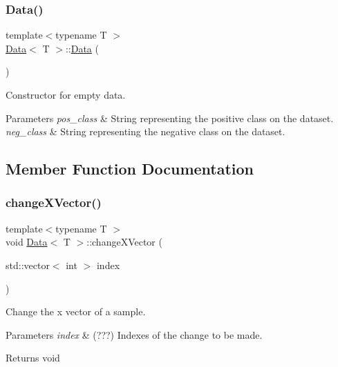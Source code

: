 \subsubsection{\texorpdfstring{Data()}{Data()}\hspace{0.1cm}{\footnotesize\ttfamily [2/2]}}
{\footnotesize\ttfamily template$<$typename T $>$ \\
\hyperlink{class_data}{Data}$<$ T $>$\+::\hyperlink{class_data}{Data} (\begin{DoxyParamCaption}{ }\end{DoxyParamCaption})}



Constructor for empty data. 


\begin{DoxyParams}{Parameters}
{\em pos\+\_\+class} & String representing the positive class on the dataset. \\
\hline
{\em neg\+\_\+class} & String representing the negative class on the dataset. \\
\hline
\end{DoxyParams}


\subsection{Member Function Documentation}
\mbox{\label{class_data_a9cf86608e6a02b80c9755646d7cb55fb}} 
\subsubsection{\texorpdfstring{change\+X\+Vector()}{changeXVector()}}
{\footnotesize\ttfamily template$<$typename T $>$ \\
void \hyperlink{class_data}{Data}$<$ T $>$\+::change\+X\+Vector (\begin{DoxyParamCaption}\item[{std\+::vector$<$ int $>$}]{index }\end{DoxyParamCaption})}



Change the x vector of a sample. 


\begin{DoxyParams}{Parameters}
{\em index} & (???) Indexes of the change to be made. \\
\hline
\end{DoxyParams}
\begin{DoxyReturn}{Returns}
void 
\end{DoxyReturn}
\mbox{\label{class_data_ae1cc8dec46ae498a0d00f4e573edc795}} 

